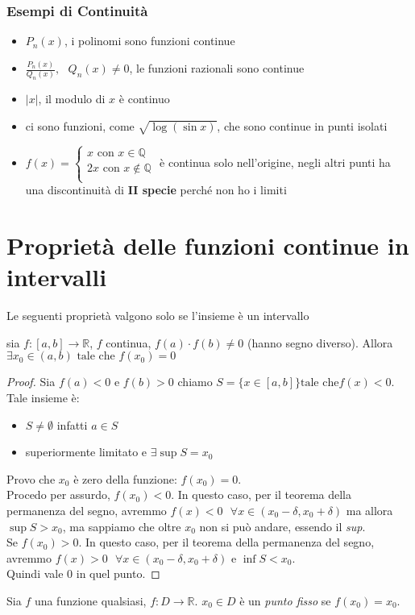 \documentclass[a4paper,12pt, oneside]{book}
\begin{document}
\subsubsection{Esempi di Continuità}
\begin{itemize}
	\item $P_n(x)$, i polinomi sono funzioni continue
	\item $\frac{P_n(x)}{Q_n(x)}, \mbox{ } Q_n(x)\neq 0$, le funzioni razionali sono continue
	\item $|x|$, il modulo di $x$ è continuo
	\item ci sono funzioni, come $\sqrt{\log(\sin x)}$, che sono continue in punti isolati
	\item $f(x)=\left\{
		      \begin{array}{ll}
			      x \mbox{ con } x\in\mathbb{Q}      \\
			      2x \mbox{ con } x\not\in\mathbb{Q} \\
		      \end{array}
		      \right.$ è continua solo nell'origine, negli altri punti ha una discontinuità di \textbf{II specie} perché non ho i limiti
\end{itemize}
\newpage
\section{Proprietà delle funzioni continue in intervalli}
Le seguenti proprietà valgono solo se l'insieme è un intervallo
\begin{teorema}
	sia $f:[a,b]\rightarrow \mathbb{R}$, $f$ continua, $f(a)\cdot f(b)\neq 0$ (hanno segno diverso). Allora $\exists x_0\in (a,b) \mbox{ tale che } f(x_0)=0$
\end{teorema}
\begin{proof}
	Sia $f(a)<0$ e $f(b)>0$ chiamo $S=\{x\in [a,b]\} \mbox{tale che} f(x)<0$. Tale insieme è:
	\begin{itemize}
		\item $S \neq \emptyset$ infatti $a\in S$
		\item superiormente limitato e $\exists \sup S= x_0$
	\end{itemize}
	Provo che $x_0$ è zero della funzione: $f(x_0)=0$.\\ Procedo per assurdo, $f(x_0)<0$. In questo caso, per il teorema della permanenza del segno, avremmo  $f(x)<0 \mbox{ } \forall x \in (x_0-\delta, x_0+\delta)$ ma allora $\sup S>x_0$, ma sappiamo che oltre $x_0$ non si può andare, essendo il \textit{sup}.\\
	Se $f(x_0)>0$. In questo caso, per il teorema della permanenza del segno, avremmo $f(x)>0 \mbox{ } \forall x \in (x_0-\delta, x_0+\delta)$ e $\inf S<x_0$.\\
	Quindi vale $0$ in quel punto.
\end{proof}
\begin{shaded}
	Sia $f$ una funzione qualsiasi, $f:D\rightarrow \mathbb{R}$. $x_0\in D$ è un \textit{punto fisso} se $f(x_0)=x_0$.
\end{shaded}
\end{document}
